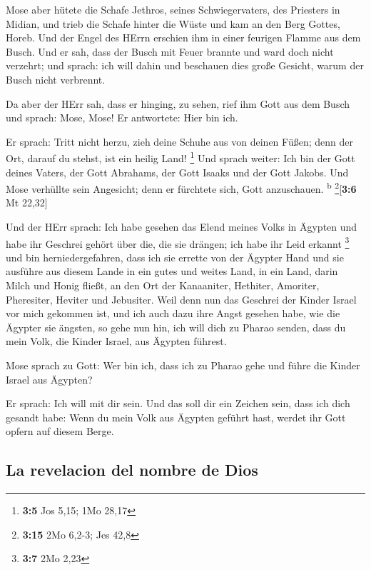  Mose aber hütete die Schafe Jethros, seines
Schwiegervaters, des Priesters in Midian, und trieb die Schafe hinter
die Wüste und kam an den Berg Gottes, Horeb.  Und der
Engel des HErrn erschien ihm in einer feurigen Flamme aus dem Busch. Und
er sah, dass der Busch mit Feuer brannte und ward doch nicht verzehrt;
 und sprach: ich will dahin und beschauen dies große
Gesicht, warum der Busch nicht verbrennt.

 Da aber der HErr sah, dass er hinging, zu sehen, rief ihm
Gott aus dem Busch und sprach: Mose, Mose! Er antwortete: Hier bin ich.

 Er sprach: Tritt nicht herzu, zieh deine Schuhe aus von
deinen Füßen; denn der Ort, darauf du stehst, ist ein heilig Land!
\footnote{\textbf{3:5} Jos 5,15; 1Mo 28,17}  Und sprach
weiter: Ich bin der Gott deines Vaters, der Gott Abrahams, der Gott
Isaaks und der Gott Jakobs. Und Mose verhüllte sein Angesicht; denn er
fürchtete sich, Gott anzuschauen. \textsuperscript{b}
\footnote{\textbf{3:15} 2Mo 6,2-3; Jes 42,8}{[}\textbf{3:6} Mt 22,32{]}

 Und der HErr sprach: Ich habe gesehen das Elend meines
Volks in Ägypten und habe ihr Geschrei gehört über die, die sie drängen;
ich habe ihr Leid erkannt \footnote{\textbf{3:7} 2Mo 2,23}
 und bin herniedergefahren, dass ich sie errette von der
Ägypter Hand und sie ausführe aus diesem Lande in ein gutes und weites
Land, in ein Land, darin Milch und Honig fließt, an den Ort der
Kanaaniter, Hethiter, Amoriter, Pheresiter, Heviter und Jebusiter.
 Weil denn nun das Geschrei der Kinder Israel vor mich
gekommen ist, und ich auch dazu ihre Angst gesehen habe, wie die Ägypter
sie ängsten,  so gehe nun hin, ich will dich zu Pharao
senden, dass du mein Volk, die Kinder Israel, aus Ägypten führest.

 Mose sprach zu Gott: Wer bin ich, dass ich zu Pharao
gehe und führe die Kinder Israel aus Ägypten?

 Er sprach: Ich will mit dir sein. Und das soll dir ein
Zeichen sein, dass ich dich gesandt habe: Wenn du mein Volk aus Ägypten
geführt hast, werdet ihr Gott opfern auf diesem Berge.

\hypertarget{la-revelacion-del-nombre-de-dios}{%
\subsection{La revelacion del nombre de
Dios}\label{la-revelacion-del-nombre-de-dios}}


